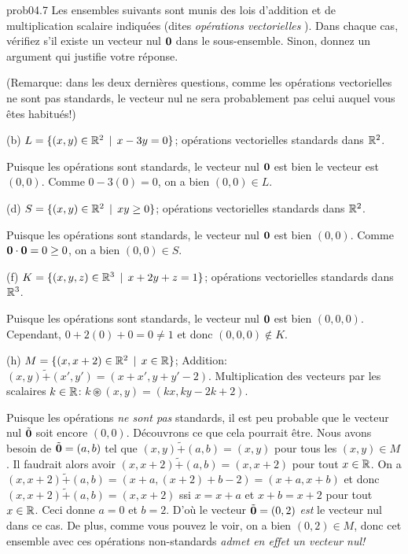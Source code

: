 \bigskip
\begin{sol}{prob04.7}  Les ensembles
suivants sont munis des lois d'addition et de
multiplication scalaire indiquées (dites {\emph{ opérations vectorielles } }). Dans chaque cas, vérifiez
s'il existe un vecteur nul $\mathbf{0}$ dans le sous-ensemble. Sinon, donnez un argument qui justifie votre réponse.

(Remarque: dans les deux dernières questions, comme les opérations
vectorielles ne sont pas standards, le vecteur nul ne
sera probablement pas celui auquel vous êtes habitués!)

\medskip
(b) $L=\{(x, y) \in \mathbb{R}^2\, \mid \, x -3y=0 \}$; opérations vectorielles
standards dans $\mathbb{R}^2$.

\soln Puisque les opérations sont standards, le vecteur nul $\mathbf{0}$ est bien le vecteur est $(0,0)$. Comme $0- 3(0)=0$, on a bien $(0,0)\in L$.

\medskip
(d) $S=\{(x, y) \in \mathbb{R}^2\, \mid \, xy \ge 0 \}$; opérations vectorielles
standards dans $\mathbb{R}^2$.

\soln Puisque les opérations sont standards, le vecteur nul $\mathbf{0}$ est bien $(0,0)$. Comme $\mathbf{0}\cdot \mathbf{0}=0\ge 0$, on a bien $(0,0)\in S$.

\medskip
(f) $K=\{(x, y, z) \in \mathbb{R}^3\, \mid \, x+2y+z=1 \}$; opérations vectorielles
standards dans $\mathbb{R}^3$.

\soln Puisque les opérations sont standards, le vecteur nul $\mathbf{0}$ est bien $(0,0,0)$. Cependant, $0+2(0)+0=0\not=1$ et donc
$(0,0,0)\notin K$.

\medskip
(h) $M=\{(x, x+2) \in \mathbb{R}^2\, \mid \, x\in \mathbb{R}\}$; Addition:
$(x,y) \tilde+ (x',y')=(x+x', y+y' -2)$. Multiplication des vecteurs
par les scalaires $k\in \mathbb{R}$: $k\circledast (x,y)=(kx, ky-2k+2)$.

\soln Puisque les opérations {\emph{ne sont pas}} standards, il est peu probable
que le vecteur nul $\tilde{\mathbf{0}}$ soit encore $(0,0)$. Découvrons ce que cela
pourrait être. Nous avons besoin de $\tilde {\mathbf{0}}=(a,b)$ tel que
$(x,y) \tilde+ (a,b)=(x , y )$ pour tous les $(x,y) \in M$. Il faudrait alors avoir $(x,x+2) \tilde+ (a,b)=(x, x+2)$ pour tout
$x\in \mathbb{R}$. On a
$(x,x+2) \tilde+ (a,b)=(x+a, (x+2)+b -2)=(x+a, x+b)$ et donc
$(x,x+2) \tilde+ (a,b)=(x, x+2)$ ssi $x=x+a$ et
$x+b=x+2$ pour tout $x\in \mathbb{R}$. Ceci donne $a=0$
et $b=2$. D'o\`u le vecteur $\tilde {\mathbf{0}}=(0,2)$ {\emph{est}} le
vecteur nul dans ce cas. De plus, comme vous pouvez le voir, on a bien
$(0,2)\in M$, donc cet ensemble avec ces opérations non-standards {\emph{admet
en effet un vecteur nul!}}
\medskip
\end{sol}


